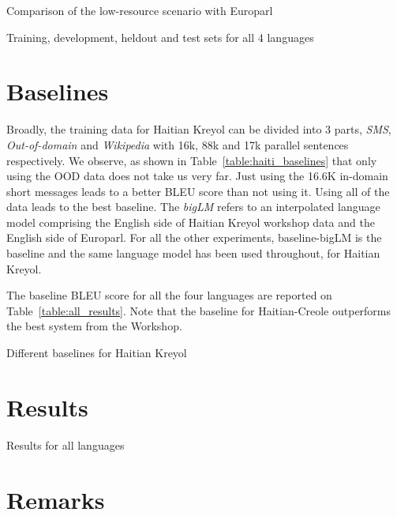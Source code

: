 \begin{table*}
	\small
	\centering
	
	\caption{Comparison of the low-resource scenario with Europarl}
	\label{table:datasettings}
\end{table*}


 \begin{table*}
             \small
             \centering
             
             \caption{Training, development, heldout and test sets for all 4 languages}
             \label{table:ddtt}
 \end{table*}



\section{Baselines}
\label{sec:baselines}
Broadly, the training data for Haitian Kreyol can be divided into 3 parts, \emph{SMS}, \emph{Out-of-domain} and \emph{Wikipedia} with 16k, 88k and 17k parallel sentences respectively. We observe, as shown in Table~\ref{table:haiti_baselines} that only using the OOD data does not take us very far. Just using the 16.6K in-domain short messages leads to a better BLEU score than not using it. Using all of the data leads to the best baseline. The \emph{bigLM} refers to an interpolated language model comprising the English side of Haitian Kreyol workshop data and the English side of Europarl. For all the other experiments, baseline-bigLM is the baseline and the same language model has been used throughout, for Haitian Kreyol. 

The baseline BLEU score for all the four languages are reported on Table~\ref{table:all_results}. Note that the baseline for Haitian-Creole outperforms the best system from the Workshop. 

\begin{table*}
	\small
	\centering
	
	\caption{Different baselines for Haitian Kreyol}
	\label{table:haiti_baselines}
\end{table*}




\section{Results}
\label{sec:results}


\begin{table*}
	\small
	\centering
	
	\caption{Results for all languages}
	\label{table:all_results}
\end{table*}


\section{Remarks}
\label{sec:remarks}